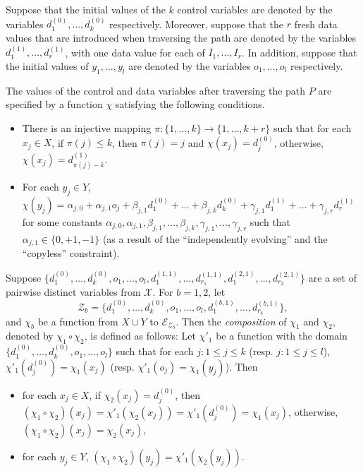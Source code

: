 \documentclass[runningheads,a4paper]{llncs}
\def\Ee{{\mathcal{E} }}
\def\Zz{{\mathcal{Z} }}
\newcommand\intvars{\mathcal{X}}
\begin{document}
Suppose that the initial values of the $k$ control variables are denoted by the variables $d^{(0)}_1,\dots,d^{(0)}_k$ respectively. Moreover, suppose that the $r$ fresh data values that are introduced when traversing the path are denoted by the variables $d^{(1)}_{1},\dots,d^{(1)}_{r}$, with one data value for each of $I_{1},\dots,I_{r}$. 
In addition, suppose that the initial values of $y_1,\dots, y_l$ are denoted by the variables $o_1,\dots,o_l$ respectively. 

\begin{proposition}\label{prop-sum-path}
The values of the control and data variables after traversing the path $P$ are specified by a function $\chi$ satisfying the following conditions.
\begin{itemize}
\item There is an injective mapping $\pi: \{1,\dots,k\} \rightarrow \{1,\dots, k+r\}$ such that for each $x_j \in X$, if $\pi(j) \le k$, then $\pi(j)=j$ and $\chi(x_j)=d^{(0)}_{j}$, otherwise, $\chi(x_j)=d^{(1)}_{\pi(j)-k}$.
% 
\item For each $y_j \in Y$, $\chi(y_j) = \alpha_{j,0} + \alpha_{j,1} o_j + \beta_{j,1} d^{(0)}_1 + \dots + \beta_{j,k} d^{(0)}_k + \gamma_{j,1} d^{(1)}_1 +\dots + \gamma_{j,r} d^{(1)}_{r}$ for some constants $\alpha_{j,0},\alpha_{j,1}, \beta_{j,1},\dots,\beta_{j,k}, \gamma_{j,1},\dots,\gamma_{j,r}$ such that $\alpha_{j,1} \in \{0,+1,-1\}$ (as a result of the ``independently evolving'' and the ``copyless'' constraint).
\end{itemize}
\end{proposition}

Suppose $\{d^{(0)}_1,\dots,d^{(0)}_k, o_1,\dots,o_l, d^{(1,1)}_1,\dots,d^{(1,1)}_{r_1}, d^{(2,1)}_1,\dots,d^{(2,1)}_{r_2}\}$ are a set of pairwise distinct variables from $\intvars$. For $b=1,2$, let 
\[\Zz_b=\{d^{(0)}_1,\dots,d^{(0)}_k, o_1,\dots,o_l, d^{(b,1)}_1,\dots,d^{(b,1)}_{r_b}\},\] and $\chi_b$ be a function from $X \cup Y$ to $\Ee_{\mathcal{Z}_b}$. Then the \emph{composition} of $\chi_1$ and $\chi_2$, denoted by $\chi_1 \circ \chi_2$, is defined as follows: Let $\chi'_1$ be a function with the domain $\{d^{(0)}_1,\dots,d^{(0)}_k, o_1,\dots,o_l\}$ such that for each $j: 1 \le j \le k$ (resp. $j: 1 \le j \le l$), $\chi'_1(d^{(0)}_j)=\chi_1(x_j)$ (resp. $\chi'_1(o_j)=\chi_1(y_j)$). Then
\begin{itemize}
\item for each $x_j \in X$, if $\chi_2(x_j) = d^{(0)}_j$, then $(\chi_1 \circ \chi_2)(x_j)=\chi'_1(\chi_2(x_j)) = \chi'_1(d^{(0)}_j)=\chi_1(x_j)$, otherwise, $(\chi_1 \circ \chi_2)(x_j)=\chi_2(x_j)$,
%
\item for each $y_j \in Y$, $(\chi_1 \circ \chi_2)(y_j)=\chi'_1(\chi_2(y_j))$.
\end{itemize}
\end{document}
